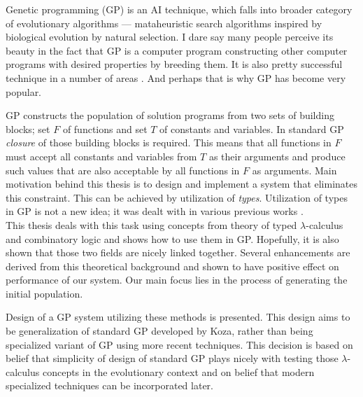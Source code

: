 \documentclass[12pt,a4paper]{report}
\begin{document}
Genetic programming (GP) is an AI technique, which falls into broader category 
of evolutionary algorithms  ---  mataheuristic  search algorithms inspired  by 
biological evolution by natural selection. I dare say many people perceive its beauty in the  fact that GP is a computer program  constructing other computer programs %
with desired properties by breeding them. 
It is also pretty successful technique in a number of areas \cite{koza05}. 
And perhaps that is why GP has become very popular.    

GP constructs the population of solution programs from 
two sets of building blocks; set $F$ of functions 
and set $T$ of constants and variables. 
In standard GP \textit{closure} of those 
building blocks is required.
This means that all functions in $F$ must accept all 
constants and variables from $T$ as their arguments and produce 
such values that are also acceptable by all functions in $F$ as arguments.
Main motivation behind this thesis is to design and implement a system that
eliminates this constraint. 
This can be achieved by utilization of \textit{types}.
Utilization of types in GP is not a new idea; 
it was dealt with in various previous works 
\cite{yu01,montana95,haynes96,olsson94}.\\

This thesis deals with this task using concepts from
theory of typed $\lambda$-calculus and combinatory logic
and shows how to use them in GP. 
Hopefully, it is also shown that those two fields are
nicely linked together.
Several enhancements are derived from this theoretical background
and shown to have positive effect on performance of our system.  
Our main focus lies in the process of generating the initial population.
 
Design of a GP system utilizing these methods is presented.
This design aims to be generalization of standard GP 
developed by Koza\cite{koza92}, rather than being 
specialized variant of GP using more recent techniques.
This decision is based on belief
that simplicity of design of standard GP plays nicely
with testing those $\lambda$-calculus concepts in 
the evolutionary context and on belief that modern specialized 
techniques can be incorporated later.\\
  
\end{document}
